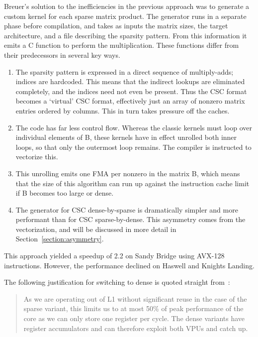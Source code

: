       Breuer's solution to the inefficiencies in the previous approach was to generate a custom kernel for each sparse matrix product. The generator runs in a separate phase before compilation, and takes as inputs the matrix sizes, the target architecture, and a file describing the sparsity pattern. From this information it emits a C function to perform the multiplication. These functions differ from their predecessors in several key ways. 

      \begin{enumerate}
        \item The sparsity pattern is expressed in a direct sequence of multiply-adds; indices are hardcoded. This means that the indirect lookups are eliminated completely, and the indices need not even be present. Thus the CSC format becomes a `virtual' CSC format, effectively just an array of nonzero matrix entries ordered by columns. This in turn takes pressure off the caches. 

        \item The code has far less control flow. Whereas the classic kernels must loop over individual elements of B, these kernels have in effect unrolled both inner loops, so that only the outermost loop remains. The compiler is instructed to vectorize this. 

        \item This unrolling emits one FMA per nonzero in the matrix B, which means that the size of this algorithm can run up against the instruction cache limit if B becomes too large or dense.

        \item The generator for CSC dense-by-sparse is dramatically simpler and more performant than for CSC sparse-by-dense. This asymmetry comes from the vectorization, and will be discussed in more detail in Section~\ref{section:asymmetry}.

      \end{enumerate}

      This approach yielded a speedup of 2.2 on Sandy Bridge using AVX-128 instructions. However, the performance declined on Haswell and Knights Landing. 

      The following justification for switching to dense is quoted straight from~\cite{Jeffers:2016:IXP:3050856}:
      \begin{quotation}
      As we are operating out of L1 without significant reuse in the case of the sparse variant, this limits us to at most 50\% of peak performance of the core as we can only store one register per cycle. The dense variants have register accumulators and can therefore exploit both VPUs and catch up.
      \end{quotation}

